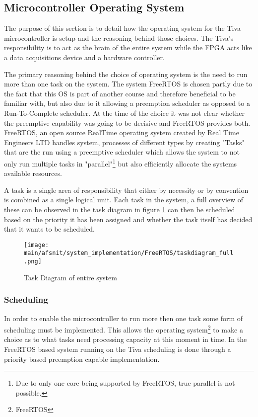 \documentclass[../../../main]{subfiles}
\begin{document}
\subsection{Microcontroller Operating System}

The purpose of this section is to detail how the operating system for the Tiva microcontroller is setup and the reasoning behind those choices. The Tiva's responsibility is to act as the brain of the entire system while the FPGA acts like a data acquisitions device and a hardware controller.

The primary reasoning behind the choice of operating system is the need to run more than one task on the system. The system FreeRTOS is chosen partly due to the fact that this OS is part of another course and therefore beneficial to be familiar with, but also due to it allowing a preemption scheduler as opposed to a Run-To-Complete scheduler. At the time of the choice it was not clear whether the preemptive capability was going to be decisive and FreeRTOS provides both.
\\

FreeRTOS, an open source RealTime operating system created by Real Time Engineers LTD handles system, processes of different types by creating "Tasks" that are the run using a preemptive scheduler which allows the system to not only run multiple tasks in "parallel"\footnote{Due to only one core being supported by FreeRTOS, true parallel is not possible.} but also efficiently allocate the systems available resources.


A task is a single area of responsibility that either by necessity or by convention is combined as a single logical unit. Each task in the system, a full overview of these can be observed in the task diagram in figure \ref{fig:entire_task_diagram} can then be scheduled based on the priority it has been assigned and whether the task itself has decided that it wants to be scheduled.

\begin{figure}[H]
\texttt{[image: \\main/afsnit/system\_implementation/FreeRTOS/taskdiagram\_full.png]}
\caption{Task Diagram of entire system}
\label{fig:entire_task_diagram}
\end{figure}

\subsubsection{Scheduling}

In order to enable the microcontroller to run more then one task some form of scheduling must be implemented. This allows the operating system\footnote{FreeRTOS} to make a choice as to what tasks need processing capacity at this moment in time. In the FreeRTOS based system running on the Tiva scheduling is done through a priority based preemption capable implementation.
\end{document}
